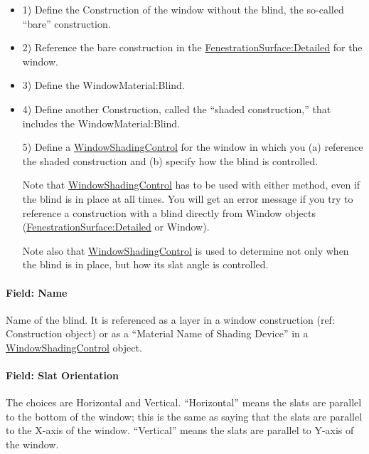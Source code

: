 \begin{itemize}
\item 1) Define the Construction of the window without the blind, the so-called ``bare'' construction.

\item 2) Reference the bare construction in the \hyperref[fenestrationsurfacedetailed]{FenestrationSurface:Detailed} for the window.

\item 3) Define the WindowMaterial:Blind.

\item 4) Define another Construction, called the ``shaded construction,'' that includes the WindowMaterial:Blind.

\item[5)] Define a \hyperref[windowpropertyshadingcontrol]{WindowShadingControl} for the window in which you (a) reference the shaded construction and (b) specify how the blind is controlled.

Note that \hyperref[windowpropertyshadingcontrol]{WindowShadingControl} has to be used with either method, even if the blind is in place at all times. You will get an error message if you try to reference a construction with a blind directly from Window objects (\hyperref[fenestrationsurfacedetailed]{FenestrationSurface:Detailed} or Window).

Note also that \hyperref[windowpropertyshadingcontrol]{WindowShadingControl} is used to determine not only when the blind is in place, but how its slat angle is controlled.

\end{itemize}

\paragraph{Field: Name}\label{field-name-17-007}

Name of the blind. It is referenced as a layer in a window construction (ref: Construction object) or as a ``Material Name of Shading Device'' in a \hyperref[windowpropertyshadingcontrol]{WindowShadingControl} object.

\paragraph{Field: Slat Orientation}\label{field-slat-orientation}

The choices are Horizontal and Vertical. ``Horizontal'' means the slats are parallel to the bottom of the window; this is the same as saying that the slats are parallel to the X-axis of the window. ``Vertical'' means the slats are parallel to Y-axis of the window.

